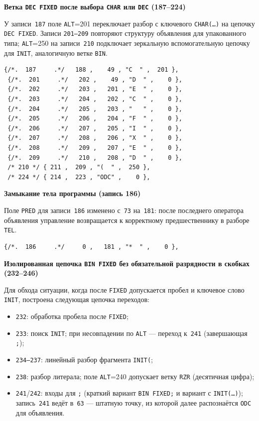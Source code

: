 \documentclass[a4paper,14pt]{extarticle}
\newcommand{\blocktitle}[1]{\par\needspace{4\baselineskip}\noindent\textbf{#1}\par\vspace{0.35\baselineskip}}
\begin{document}
\blocktitle{Ветка \texttt{DEC FIXED} после выбора \texttt{CHAR} или \texttt{DEC} (187--224)}

У записи~\texttt{187} поле \texttt{ALT}=201 переключает разбор с ключевого
\texttt{CHAR(\ldots)} на цепочку \texttt{DEC FIXED}. Записи \texttt{201--209}
повторяют структуру объявления для упакованного типа; \texttt{ALT}=250 на
записи~\texttt{210} подключает зеркальную вспомогательную цепочку для
\texttt{INIT}, аналогичную ветке \texttt{BIN}.

\begin{lstlisting}[style=Cstyle,caption={Записи 187 и 201--210, 224},label=lst:sint_dec_entry]
 {/*.  187     .*/   188 ,    49 , "C  " ,  201 },
 {/*.  201     .*/   202 ,    49 , "D  " ,    0 },
 {/*.  202     .*/   203 ,   201 , "E  " ,    0 },
 {/*.  203     .*/   204 ,   202 , "C  " ,    0 },
 {/*.  204     .*/   205 ,   203 , "   " ,    0 },
 {/*.  205     .*/   206 ,   204 , "F  " ,    0 },
 {/*.  206     .*/   207 ,   205 , "I  " ,    0 },
 {/*.  207     .*/   208 ,   206 , "X  " ,    0 },
 {/*.  208     .*/   209 ,   207 , "E  " ,    0 },
 {/*.  209     .*/   210 ,   208 , "D  " ,    0 },
 /* 210 */ { 211 ,  209 , "(  " ,  250 },
 /* 224 */ { 214 ,  223 , "ODC" ,    0 },
\end{lstlisting}

\blocktitle{Замыкание тела программы (запись 186)}

Поле \texttt{PRED} для записи~\texttt{186} изменено с~\texttt{73} на~\texttt{181}:
после последнего оператора объявления управление возвращается к корректному
предшественнику в разборе \texttt{TEL}.

\begin{lstlisting}[style=Cstyle,caption={Запись 186},label=lst:sint_tel186]
 {/*.  186     .*/     0 ,   181 , "*  " ,    0 },
\end{lstlisting}

\blocktitle{Изолированная цепочка \texttt{BIN FIXED} без обязательной разрядности в скобках (232--246)}

Для обхода ситуации, когда после \texttt{FIXED} допускается пробел и ключевое
слово \texttt{INIT}, построена следующая цепочка переходов:

\begin{itemize}[nosep,leftmargin=*]
  \item \texttt{232}: обработка пробела после \texttt{FIXED};
  \item \texttt{233}: поиск \texttt{INIT}; при несовпадении по \texttt{ALT} —
        переход к~\texttt{241} (завершающая \texttt{;});
  \item \texttt{234--237}: линейный разбор фрагмента \texttt{INIT(};
  \item \texttt{238}: разбор литерала; поле \texttt{ALT}=240 допускает ветку
        \texttt{RZR} (десятичная цифра);
  \item \texttt{241}/\texttt{242}: входы для \texttt{;} (краткий вариант
        \texttt{BIN FIXED;} и вариант с \texttt{INIT(\ldots)}); запись~\texttt{241}
        ведёт в~\texttt{63} — штатную точку, из которой далее распознаётся
        \texttt{ODC} для объявления.
\end{itemize}
\end{document}
